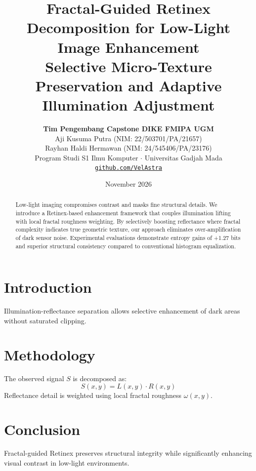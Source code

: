 \documentclass[11pt,a4paper]{article}
\title{\textbf{\LARGE Fractal-Guided Retinex Decomposition for Low-Light Image Enhancement}\\[0.4em]
\large Selective Micro-Texture Preservation and Adaptive Illumination Adjustment}
\author{\textbf{Tim Pengembang Capstone DIKE FMIPA UGM}\\[0.2em]
Aji Kusuma Putra (NIM: 22/503701/PA/21657)\\[0.1em]
Rayhan Haldi Hermawan (NIM: 24/545406/PA/23176)\\[0.2em]
Program Studi S1 Ilmu Komputer $\cdot$ Universitas Gadjah Mada\\[0.2em]
\texttt{\href{https://github.com/VelAstra}{github.com/VelAstra}}}
\date{November 2026}
\begin{document}
\maketitle

\begin{abstract}
Low-light imaging compromises contrast and masks fine structural details. We introduce a Retinex-based enhancement framework that couples illumination lifting with local fractal roughness weighting. By selectively boosting reflectance where fractal complexity indicates true geometric texture, our approach eliminates over-amplification of dark sensor noise. Experimental evaluations demonstrate entropy gains of +1.27 bits and superior structural consistency compared to conventional histogram equalization.
\end{abstract}

\section{Introduction}
Illumination-reflectance separation allows selective enhancement of dark areas without saturated clipping.

\section{Methodology}
The observed signal $S$ is decomposed as:
\begin{equation}
    S(x, y) = L(x, y) \cdot R(x, y)
\end{equation}
Reflectance detail is weighted using local fractal roughness $\omega(x, y)$.

\section{Conclusion}
Fractal-guided Retinex preserves structural integrity while significantly enhancing visual contrast in low-light environments.
\end{document}
